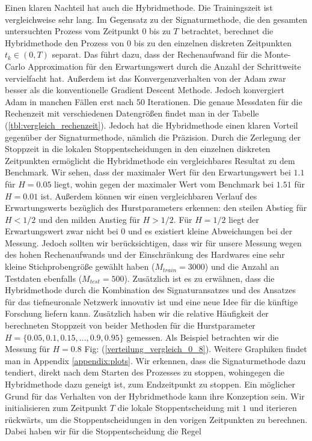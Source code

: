 \documentclass[12pt,titlepage,headsepline]{article}
\begin{document}
      \hfill\break
      Einen klaren Nachteil hat auch die Hybridmethode. Die Trainingszeit ist vergleichweise sehr lang. Im Gegensatz zu der Signaturmethode, die den gesamten untersuchten Prozess vom Zeitpunkt $0$ bis zu $T$ betrachtet, berechnet die Hybridmethode den Prozess von $0$ bis zu den einzelnen diskreten Zeitpunkten $t_k \in (0,T)$ separat.
      \hfill\break
      Das führt dazu, dass der Rechenaufwand für die Monte-Carlo Approximation für den Erwartungswert durch die Anzahl der Schrittweite vervielfacht hat. Außerdem ist das Konvergenzverhalten von der Adam zwar besser als die konventionelle Gradient Descent Methode. Jedoch konvergiert Adam in manchen Fällen erst nach 50 Iterationen. Die genaue Messdaten für die Rechenzeit mit verschiedenen Datengrößen findet man in der Tabelle (\ref{tbl:vergleich_rechenzeit}).
      \hfill\break
      Jedoch hat die Hybridmethode einen klaren Vorteil gegenüber der Signaturmethode, nämlich die Präzision. Durch die Zerlegung der Stoppzeit in die lokalen Stoppentscheidungen in den einzelnen diskreten Zeitpunkten ermöglicht die Hybridmethode ein vergleichbares Resultat zu dem Benchmark. Wir sehen, dass der maximaler Wert für den Erwartungswert bei $1.1$ für $H=0.05$ liegt, wohin gegen der maximaler Wert vom Benchmark bei $1.51$ für $H=0.01$ ist. Außerdem können wir einen vergleichbaren Verlauf des Erwartungswerts bezüglich des Hurstparameters erkennen: den steilen Abstieg für $H<1/2$ und den milden Anstieg für $H>1/2$. Für $H=1/2$ liegt der Erwartungswert zwar nicht bei 0 und es existiert kleine Abweichungen bei der Messung. Jedoch sollten wir berücksichtigen, dass wir für unsere Messung wegen des hohen Rechenaufwands und der Einschränkung des Hardwares eine sehr kleine Stichprobengröße gewählt haben ($M_{train}=3000$) und die Anzahl an Testdaten ebenfalls ($M_{test} = 500$). Zusätzlich ist es zu erwähnen, dass die Hybridmethode durch die Kombination des Signaturansatzes und des Ansatzes für das tiefneuronale Netzwerk innovativ ist und eine neue Idee für die künftige Forschung liefern kann.
      \hfill\break
      Zusätzlich haben wir die relative Häufigkeit der berechneten Stoppzeit von beider Methoden für die Hurstparameter $H = \{0.05,0.1,0.15,\ldots,0.9,0.95\}$ gemessen. Als Beispiel betrachten wir die Messung für $H=0.8$ Fig: (\ref{verteilung_vergleich_0_8}). Weitere Graphiken findet man in Appendix \ref{appendix:plots}.
      \hfill\break
      Wir erkennen, dass die Signaturmethode dazu tendiert, direkt nach dem Starten des Prozesses zu stoppen, wohingegen die Hybridmethode dazu geneigt ist, zum Endzeitpunkt zu stoppen. Ein möglicher Grund für das Verhalten von der Hybridmethode kann ihre Konzeption sein. Wir initialisieren zum Zeitpunkt $T$ die lokale Stoppentscheidung mit $1$ und iterieren rückwärts, um die Stoppentscheidungen in den vorigen Zeitpunkten zu berechnen. Dabei haben wir für die Stoppentscheidung die Regel
\end{document}
